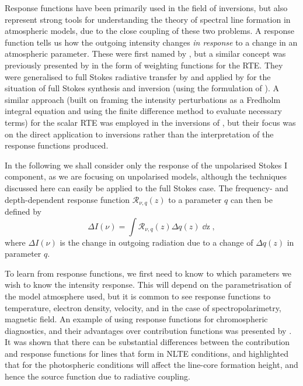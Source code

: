 Response functions have been primarily used in the field of inversions, but also represent strong tools for understanding the theory of spectral line formation in atmospheric models, due to the close coupling of these two problems.
A response function tells us how the outgoing intensity changes \emph{in response} to a change in an atmospheric parameter.
These were first named by \citet{Beckers1975}, but a similar concept was previously presented by \citet{Mein1971} in the form of weighting functions for the RTE.
They were generalised to full Stokes radiative transfer by \citet{LandiDeglInnocenti1977} and applied by \citet{1992RuizCobo} for the situation of full Stokes synthesis and inversion (using the formulation of \citet{SanchezAlmeida1992}).
A similar approach (built on framing the intensity perturbations as a Fredholm integral equation and using the finite difference method to evaluate necessary terms) for the scalar RTE was employed in the inversions of \citet{Metcalf1990a}, but their focus was on the direct application to inversions rather than the interpretation of the response functions produced.

In the following we shall consider only the response of the unpolarised Stokes I component, as we are focusing on unpolarised models, although the techniques discussed here can easily be applied to the full Stokes case.
The frequency- and depth-dependent response function $\mathcal{R}_{\nu, q} (z)$ to a parameter $q$ can then be defined by
\begin{equation}
    \Delta I(\nu) = \int\mathcal{R}_{\nu, q}(z) \Delta q(z) \mathop{\dd{}z},
\end{equation}
where $\Delta I(\nu)$ is the change in outgoing radiation due to a change of $\Delta q(z)$ in parameter $q$.


To learn from response functions, we first need to know to which parameters we wish to know the intensity response.
This will depend on the parametrisation of the model atmosphere used, but it is common to see response functions to temperature, electron density, velocity, and in the case of spectropolarimetry, magnetic field.
An example of using response functions for chromospheric diagnostics, and their advantages over contribution functions was presented by \citet{Uitenbroek2006}.
It was shown that there can be substantial differences between the contribution and response functions for lines that form in NLTE conditions, and highlighted that for \Ha{} the photospheric conditions will affect the line-core formation height, and hence the source function due to radiative coupling.

